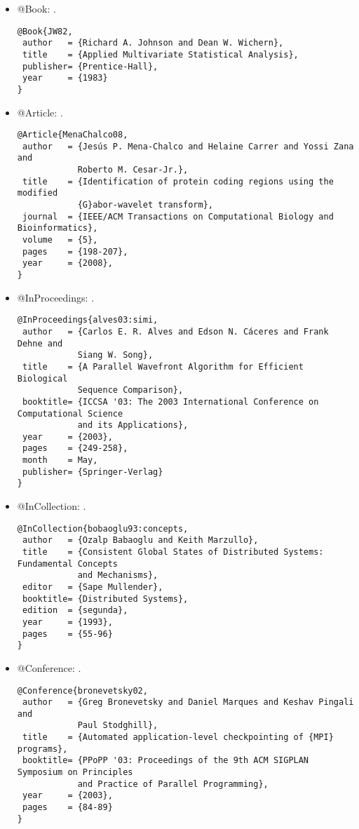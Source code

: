 \begin{itemize}
\item @Book: \cite{JW82}.
{\scriptsize\begin{verbatim}
@Book{JW82,
 author   = {Richard A. Johnson and Dean W. Wichern},
 title    = {Applied Multivariate Statistical Analysis},
 publisher= {Prentice-Hall},
 year     = {1983}
}
\end{verbatim}
}

\item @Article: \cite{MenaChalco08}.
{\scriptsize\begin{verbatim}
@Article{MenaChalco08,
 author   = {Jesús P. Mena-Chalco and Helaine Carrer and Yossi Zana and
            Roberto M. Cesar-Jr.},
 title    = {Identification of protein coding regions using the modified
            {G}abor-wavelet transform},
 journal  = {IEEE/ACM Transactions on Computational Biology and Bioinformatics},
 volume   = {5},
 pages    = {198-207},
 year     = {2008},
}
\end{verbatim}
}

\item @InProceedings: \cite{alves03:simi}.
{\scriptsize\begin{verbatim}
@InProceedings{alves03:simi,
 author   = {Carlos E. R. Alves and Edson N. Cáceres and Frank Dehne and
            Siang W. Song},
 title    = {A Parallel Wavefront Algorithm for Efficient Biological
            Sequence Comparison},
 booktitle= {ICCSA '03: The 2003 International Conference on Computational Science
            and its Applications},
 year     = {2003},
 pages    = {249-258},
 month    = May,
 publisher= {Springer-Verlag}
}
\end{verbatim}
}

\item @InCollection: \cite{bobaoglu93:concepts}.
{\scriptsize\begin{verbatim}
@InCollection{bobaoglu93:concepts,
 author   = {Ozalp Babaoglu and Keith Marzullo},
 title    = {Consistent Global States of Distributed Systems: Fundamental Concepts
            and Mechanisms},
 editor   = {Sape Mullender},
 booktitle= {Distributed Systems},
 edition  = {segunda},
 year     = {1993},
 pages    = {55-96}
}
\end{verbatim}
}

\item @Conference: \cite{bronevetsky02}.
{\scriptsize\begin{verbatim}
@Conference{bronevetsky02,
 author   = {Greg Bronevetsky and Daniel Marques and Keshav Pingali and
            Paul Stodghill},
 title    = {Automated application-level checkpointing of {MPI} programs},
 booktitle= {PPoPP '03: Proceedings of the 9th ACM SIGPLAN Symposium on Principles
            and Practice of Parallel Programming},
 year     = {2003},
 pages    = {84-89}
}
\end{verbatim}
}


\end{itemize}

